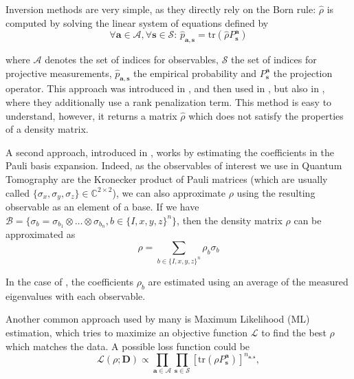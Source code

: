 \documentclass[12pt]{memoir}
\newcommand{\tr}{\text{tr}}
\newcommand{\mb}{\mathbf}
\begin{document}
Inversion methods are very simple, as they directly rely on the Born rule: $\hat \rho$ is computed by solving the linear system of equations defined by
\begin{equation*} \label{eq:inversion-method}
        \forall \mb a \in \mathcal{A},\forall \mb s \in \mathcal{S}: \, \hat p_{\mb a, \mb s} = \tr(\hat \rho P^{\mb a}_{\mb s})
\end{equation*}

where $\mathcal{A}$ denotes the set of indices for observables, $\mathcal{S}$ the set of indices for projective measurements, $\hat p_{\mb a,\mb s}$ the empirical probability and $P^{\mb a}_{\mb s}$ the projection operator. This approach was introduced in \cite{meth:linear-inversion:vogel-risken}, and then used in \cite{meth:linear-inversion:RMH}, but also in \cite{meth:linear-inversion:alquier}, where they additionally use a rank penalization term. This method is easy to understand, however, it returns a matrix $\hat \rho$ which does not satisfy the properties of a density matrix.\medbreak





A second approach, introduced in \cite{Cai-2016}, works by estimating the coefficients in the Pauli basis expansion. Indeed, as the observables of interest we use in Quantum Tomography are the Kronecker product of Pauli matrices (which are usually called $\{\sigma_x, \sigma_y, \sigma_z\} \in \mathbb{C}^{2\times 2}$), we can also approximate $\rho$ using the resulting observable as an element of a base. If we have $\mathcal{B} = \{\sigma_b = \sigma_{b_1} \otimes \dots \otimes \sigma_{b_n}, b \in \{I,x,y,z\}^n\}$, then the density matrix $\rho$ can be approximated as
\begin{equation}
    \rho = \sum_{b\in\{I,x,y,z\}^n} \rho_b \sigma_b
\end{equation}

In the case of \cite{Cai-2016}, the coefficients $\rho_b$ are estimated using an average of the measured eigenvalues with each observable.\medbreak


Another common approach used by many \cite{Guta20,meth:ML:BDP,meth:ML:JKMW,meth:ML:Lvovsky,meth:ML:Blume-Kohout,meth:ML:Suzuki,meth:ML:Hradil2004} is Maximum Likelihood (ML) estimation, which tries to maximize an objective function $\mathcal{L}$ to find the best $\rho$ which matches the data. A possible loss function could be
\begin{equation}
\mathcal{L}(\rho ; \mb{D}) \propto \prod_{\mb a \in \mathcal{A}} \prod_{\mb s \in \mathcal{S}}\left[\tr\left(\rho P_{\mb{s}}^{\mb{a}}\right)\right]^{n_{{\mb a}, {\mb s}}},
\end{equation}
\end{document}
